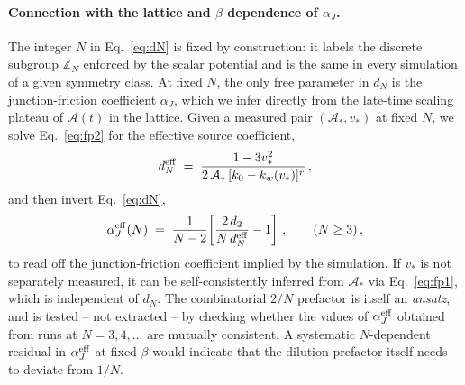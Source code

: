 \paragraph{Connection with the lattice and $\beta$ dependence of
$\alpha_J$.}
The integer $N$ in Eq.~\eqref{eq:dN} is fixed by construction: it
labels the discrete subgroup $\mathbb{Z}_N$ enforced by the scalar
potential and is the same in every simulation of a given symmetry
class. At fixed $N$, the only free parameter in $d_N$ is the
junction-friction coefficient $\alpha_J$, which we infer directly from
the late-time scaling plateau of $\mathcal{A}(t)$ in the lattice.
Given a measured pair $(\mathcal{A}_{*},v_{*})$ at fixed $N$, we solve
Eq.~\eqref{eq:fp2} for the effective source coefficient,
\begin{equation}
\label{eq:dN-eff}
d_N^{\rm eff} \;=\; \frac{1-3v_{*}^{2}}
                         {2\,\mathcal{A}_{*}\,[k_0-k_w(v_{*})]^{r}}\,,
\end{equation}
and then invert Eq.~\eqref{eq:dN},
\begin{equation}
\label{eq:alphaJ-eff}
\alpha_J^{\rm eff}(N) \;=\; \frac{1}{N-2}\!\left[\frac{2\,d_2}{N\,d_N^{\rm eff}} - 1\right]\,, \qquad (N\geq 3)\,,
\end{equation}
to read off the junction-friction coefficient implied by the
simulation. If $v_{*}$ is not separately measured, it can be
self-consistently inferred from $\mathcal{A}_{*}$ via
Eq.~\eqref{eq:fp1}, which is independent of $d_N$. The combinatorial
$2/N$ prefactor is itself an \emph{ansatz}, and is tested -- not
extracted -- by checking whether the values of $\alpha_J^{\rm eff}$
obtained from runs at $N=3,4,\dots$ are mutually consistent. A
systematic $N$-dependent residual in $\alpha_J^{\rm eff}$ at fixed
$\beta$ would indicate that the dilution prefactor itself needs to
deviate from $1/N$.

